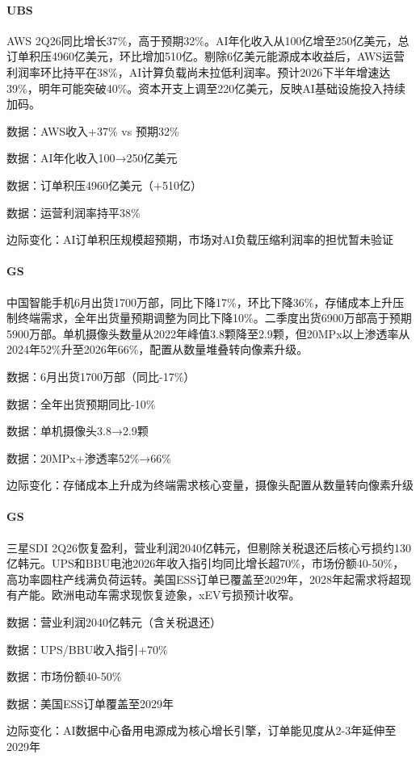 \documentclass[11pt]{ctexart}
\begin{document}
\paragraph{UBS} AWS 2Q26同比增长37\%，高于预期32\%。AI年化收入从100亿增至250亿美元，总订单积压4960亿美元，环比增加510亿。剔除6亿美元能源成本收益后，AWS运营利润率环比持平在38\%，AI计算负载尚未拉低利润率。预计2026下半年增速达39\%，明年可能突破40\%。资本开支上调至220亿美元，反映AI基础设施投入持续加码。
{\small\color{refgray}数据：AWS收入+37\% vs 预期32\%\par}
{\small\color{refgray}数据：AI年化收入100→250亿美元\par}
{\small\color{refgray}数据：订单积压4960亿美元（+510亿）\par}
{\small\color{refgray}数据：运营利润率持平38\%\par}
{\small\color{refgray}边际变化：AI订单积压规模超预期，市场对AI负载压缩利润率的担忧暂未验证\par}
\paragraph{GS} 中国智能手机6月出货1700万部，同比下降17\%，环比下降36\%，存储成本上升压制终端需求，全年出货量预期调整为同比下降10\%。二季度出货6900万部高于预期5900万部。单机摄像头数量从2022年峰值3.8颗降至2.9颗，但20MPx以上渗透率从2024年52\%升至2026年66\%，配置从数量堆叠转向像素升级。
{\small\color{refgray}数据：6月出货1700万部（同比-17\%）\par}
{\small\color{refgray}数据：全年出货预期同比-10\%\par}
{\small\color{refgray}数据：单机摄像头3.8→2.9颗\par}
{\small\color{refgray}数据：20MPx+渗透率52\%→66\%\par}
{\small\color{refgray}边际变化：存储成本上升成为终端需求核心变量，摄像头配置从数量转向像素升级\par}
\paragraph{GS} 三星SDI 2Q26恢复盈利，营业利润2040亿韩元，但剔除关税退还后核心亏损约130亿韩元。UPS和BBU电池2026年收入指引均同比增长超70\%，市场份额40-50\%，高功率圆柱产线满负荷运转。美国ESS订单已覆盖至2029年，2028年起需求将超现有产能。欧洲电动车需求现恢复迹象，xEV亏损预计收窄。
{\small\color{refgray}数据：营业利润2040亿韩元（含关税退还）\par}
{\small\color{refgray}数据：UPS/BBU收入指引+70\%\par}
{\small\color{refgray}数据：市场份额40-50\%\par}
{\small\color{refgray}数据：美国ESS订单覆盖至2029年\par}
{\small\color{refgray}边际变化：AI数据中心备用电源成为核心增长引擎，订单能见度从2-3年延伸至2029年\par}
\end{document}
